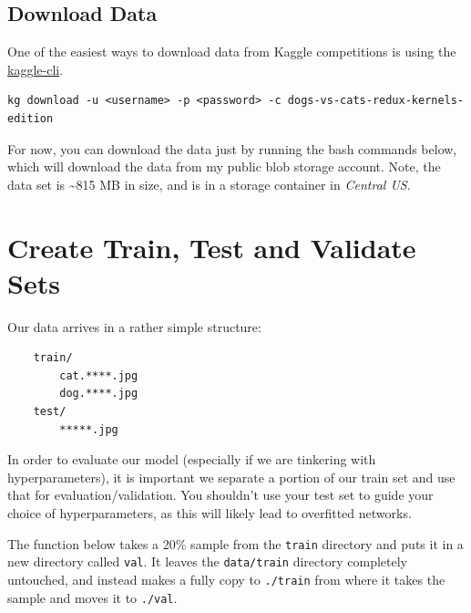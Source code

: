 \documentclass[]{book}
\newenvironment{Shaded}{\begin{snugshade}}{\end{snugshade}}
\newcommand{\FunctionTok}[1]{\textcolor[rgb]{0.00,0.00,0.00}{#1}}
\newcommand{\BuiltInTok}[1]{#1}
\newcommand{\ExtensionTok}[1]{#1}
\newcommand{\NormalTok}[1]{#1}
\theoremstyle{definition}
\theoremstyle{definition}
\theoremstyle{definition}
\theoremstyle{remark}
\begin{document}
\subsection{Download Data}\label{download-data}

One of the easiest ways to download data from Kaggle competitions is
using the \href{https://github.com/floydwch/kaggle-cli}{kaggle-cli}.

\begin{verbatim}
kg download -u <username> -p <password> -c dogs-vs-cats-redux-kernels-edition
\end{verbatim}

For now, you can download the data just by running the bash commands
below, which will download the data from my public blob storage account.
Note, the data set is \textasciitilde{}815 MB in size, and is in a
storage container in \emph{Central US}.

\begin{Shaded}
\end{Shaded}

\section{Create Train, Test and Validate
Sets}\label{create-train-test-and-validate-sets}

Our data arrives in a rather simple structure:

\begin{verbatim}
    train/
        cat.****.jpg
        dog.****.jpg
    test/
        *****.jpg
\end{verbatim}

In order to evaluate our model (especially if we are tinkering with
hyperparameters), it is important we separate a portion of our train set
and use that for evaluation/validation. You shouldn't use your test set
to guide your choice of hyperparameters, as this will likely lead to
overfitted networks.

The function below takes a 20\% sample from the \texttt{train} directory
and puts it in a new directory called \texttt{val}. It leaves the
\texttt{data/train} directory completely untouched, and instead makes a
fully copy to \texttt{./train} from where it takes the sample and moves
it to \texttt{./val}.
\end{document}
